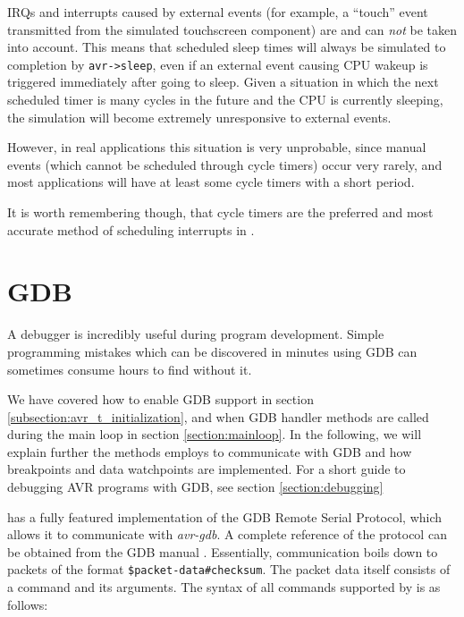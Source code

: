 \acp{IRQ} and interrupts caused by external events (for example, a ``touch'' event transmitted
from the simulated touchscreen component) are and can \emph{not} be taken into
account.
This means that scheduled sleep times will always be simulated to completion by
\lstinline|avr->sleep|, even if an external event causing \ac{CPU} wakeup is
triggered immediately after going to sleep.
Given a situation in which the next scheduled timer is many cycles in the future
and the \ac{CPU} is currently sleeping, the simulation will become extremely
unresponsive to external events.

However, in real applications this situation is very unprobable, since
manual events (which cannot be scheduled through cycle timers) occur very rarely,
and most applications will have at least some cycle timers with a short period.

It is worth remembering though, that cycle timers are the preferred and most
accurate method of scheduling interrupts in \simavr.


\section{\acf{GDB}}

A debugger is incredibly useful during program development. Simple programming mistakes
which can be discovered in minutes using \ac{GDB} can sometimes consume hours
to find without it.

We have covered how to enable \ac{GDB} support in section
\ref{subsection:avr_t_initialization}, and when \ac{GDB} handler methods are
called during the main loop in section \ref{section:mainloop}. In the following,
we will explain further the methods \simavr employs to communicate with
\ac{GDB} and how breakpoints and data watchpoints are implemented. For
a short guide to debugging \ac{AVR} programs with \ac{GDB}, see section
\ref{section:debugging}

\simavr has a fully featured implementation of the \ac{GDB} Remote Serial Protocol,
which allows it to communicate with \emph{avr-gdb}. A complete reference of
the protocol can be obtained from the \ac{GDB} manual \cite{gdb}. Essentially,
communication boils down to packets of the format \lstinline|$packet-data#checksum|.
The packet data itself consists of a command and its arguments. The syntax of
all commands supported by \simavr is as follows:

